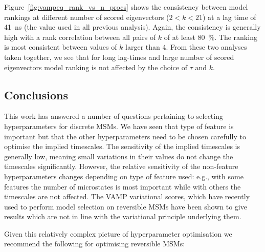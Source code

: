 \documentclass[journal=jacsat,manuscript=article]{achemso}
\begin{document}
Figure~\ref{fig:vampeq_rank_vs_n_procs} shows the consistency between model rankings at different number of scored eigenvectors ($2 < k < 21$) at a lag time of \SI{41}{\nano\second} (the value used in all previous analysis). Again, the consistency is generally high with a rank correlation between all pairs of $k$ of at least \SI{80}{\percent}. The ranking is most consistent between values of $k$ larger than \num{4}.  From these two analyses taken together, we see that for long lag-times and large number of scored eigenvectors model ranking is not affected by the choice of $\tau$ and $k$.


\subsection{Conclusions}
This work has answered a number of questions pertaining to selecting hyperparameters for discrete MSMs.  We have seen that type of feature is important but that the other hyperparameters need to be chosen carefully to optimise the implied timescales.  The sensitivity of the implied timescales is generally low, meaning small variations in their values do not change the timescales significantly.  However, the relative sensitivity of the non-feature hyperparameters changes depending on type of feature used: e.g., with some features the number of microstates is most important while with others the timescales are not affected.  The VAMP variational scores, which have recently used to perform model selection on reversible MSMs have been shown to give results which are not in line with the variational principle underlying them. 

Given this relatively complex picture of hyperparameter optimisation we recommend the following for optimising reversible MSMs: 
\end{document}
